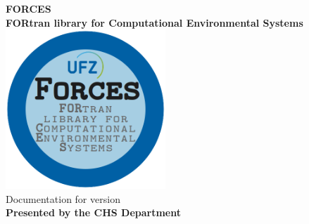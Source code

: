 \documentclass[twoside]{book}
\newcommand{\+}{\discretionary{\mbox{\scriptsize$\hookleftarrow$}}{}{}}
\begin{document}

\hypersetup{pageanchor=false,
             bookmarks=true,
             bookmarksnumbered=true,
             pdfencoding=unicode
            }
\begin{titlepage}
\vspace*{5cm}
\begin{center}%
{\Huge \textbf{FORCES}}\\
\vspace*{0.5cm}
{\Large \textbf{FORtran library for Computational Environmental Systems}}\\
\vspace*{1cm}
\includegraphics[width=6.0cm]{../doc/figures/Forces.png}\\
\vspace*{1.5cm}
{\Large Documentation for version }\\
\vspace*{5cm}
{\Large \textbf{Presented by the CHS Department}}\\
\end{center}
\end{titlepage}

\newpage
\end{document}
